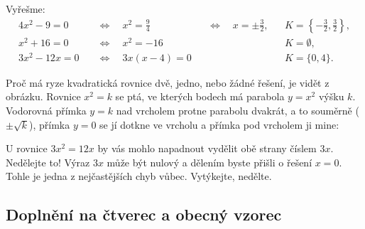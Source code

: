 \begin{example}
  Vyřešme:
  \begin{align*}
    4x^2 - 9 = 0 &\quad\Leftrightarrow\quad x^2 = \tfrac{9}{4} &&\Leftrightarrow\quad x = \pm\tfrac{3}{2}, &&K = \left\{-\tfrac{3}{2}, \tfrac{3}{2}\right\},\\
    x^2 + 16 = 0 &\quad\Leftrightarrow\quad x^2 = -16 && &&K = \emptyset,\\
    3x^2 - 12x = 0 &\quad\Leftrightarrow\quad 3x(x - 4) = 0 && &&K = \{0, 4\}.
  \end{align*}
\end{example}

Proč má ryze kvadratická rovnice dvě, jedno, nebo žádné řešení, je vidět z obrázku. Rovnice $x^2 = k$ se ptá, ve kterých bodech má parabola $y = x^2$ výšku $k$. Vodorovná přímka $y = k$ nad vrcholem protne parabolu dvakrát, a to souměrně ($\pm\sqrt{k}$), přímka $y = 0$ se jí dotkne ve vrcholu a přímka pod vrcholem ji mine:
\begin{center}
\end{center}

\begin{note}
  U rovnice $3x^2 = 12x$ by vás mohlo napadnout vydělit obě strany číslem $3x$. Nedělejte to! Výraz $3x$ může být nulový a dělením byste přišli o řešení $x = 0$. Tohle je jedna z nejčastějších chyb vůbec. Vytýkejte, nedělte.
\end{note}

\subsection{Doplnění na čtverec a obecný vzorec}\label{sec:doplneni-na-ctverec}

